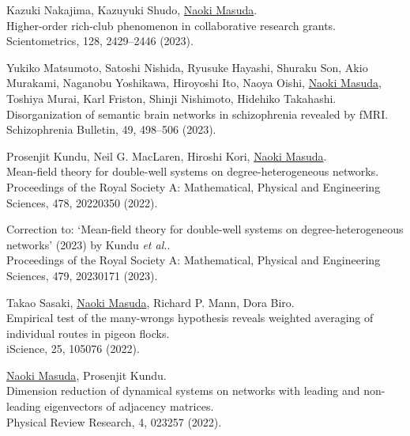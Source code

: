\documentclass[11pt,letter]{article}
\renewenvironment{itemize}{
  \begin{list}{}{
    \setlength{\leftmargin}{1.5em}
    \setlength{\itemsep}{0.25em}
    \setlength{\parskip}{0pt}
    \setlength{\parsep}{0.25em}
  }
}{
  \end{list}
}
\begin{document}
\begin{etaremune}
\item Kazuki Nakajima, Kazuyuki Shudo, \underline{Naoki Masuda}.\\
Higher-order rich-club phenomenon in collaborative research grants.\\
Scientometrics, 128, 2429--2446 (2023).


\item Yukiko Matsumoto, Satoshi Nishida, Ryusuke Hayashi, Shuraku Son, Akio Murakami, Naganobu Yoshikawa, Hiroyoshi Ito, Naoya Oishi, \underline{Naoki Masuda}, Toshiya Murai, Karl Friston, Shinji Nishimoto, Hidehiko Takahashi.\\
Disorganization of semantic brain networks in schizophrenia revealed by fMRI.\\
Schizophrenia Bulletin, 49, 498--506 (2023).

\item Prosenjit Kundu, Neil G. MacLaren, Hiroshi Kori, \underline{Naoki Masuda}.\\
Mean-field theory for double-well systems on degree-heterogeneous networks.\\
Proceedings of the Royal Society A: Mathematical, Physical and Engineering Sciences, 478, 20220350 (2022).
    \begin{itemize}
        \item Correction to: `Mean-field theory for double-well systems on degree-heterogeneous networks' (2023) by Kundu \textit{et al.}.\\
        Proceedings of the Royal Society A: Mathematical, Physical and Engineering Sciences, 479, 20230171 (2023).
    \end{itemize}
    
\item Takao Sasaki, \underline{Naoki Masuda}, Richard P. Mann, Dora Biro.\\
Empirical test of the many-wrongs hypothesis reveals weighted averaging of individual routes in pigeon flocks.\\
iScience, 25, 105076 (2022).

\item \underline{Naoki Masuda}, Prosenjit Kundu.\\
Dimension reduction of dynamical systems on networks with leading and non-leading eigenvectors of adjacency matrices.\\
Physical Review Research, 4, 023257 (2022).


\end{etaremune}
\end{document}
